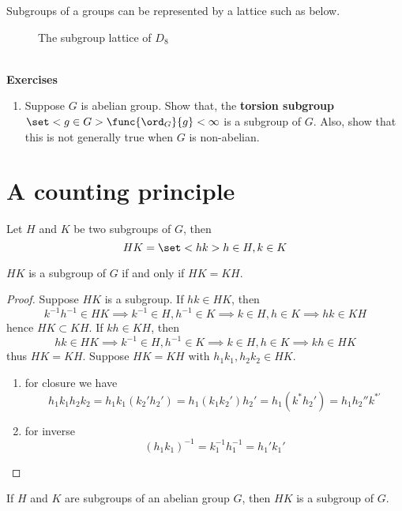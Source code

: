 Subgroups of a groups can be represented by a lattice such as below.

\begin{figure}[H]
    \centering
    
    \caption{The subgroup lattice of \(D_8\)}
\end{figure}
\ \\ 
{\Large{\textbf{Exercises}}}
\begin{enumerate}
    \item Suppose \(G\) is abelian group. Show that, the \textbf{torsion subgroup} \(\set<g \in G>{\func{\ord_G}{g} < \infty}\) is a subgroup of \(G\). Also, show that this is not generally true when \(G\) is non-abelian.
\end{enumerate}




\section{A counting principle}
Let \(H\) and \(K\) be two subgroups of \(G\), then 
\begin{equation*}
    HK = \set<hk>{h \in H, k \in K}
\end{equation*}

\begin{lemma}
    \(HK\) is a subgroup of \(G\) if and only if \(HK = KH\).
\end{lemma}
\begin{proof}
    Suppose \(HK\) is a subgroup. If \(hk \in HK\), then
    \begin{equation*}
        k^{-1}h^{-1} \in HK \implies k^{-1} \in H, h^{-1} \in K \implies k \in H,h \in K \implies hk  \in KH 
    \end{equation*}
    hence \(HK \subset KH\). If \(kh \in KH\), then 
    \begin{equation*}
        hk \in HK  \implies k^{-1} \in H, h^{-1} \in K \implies k \in H,h \in K \implies kh \in HK 
    \end{equation*}
    thus \(HK = KH\). Suppose \(HK = KH\) with \(h_1k_1, h_2k_2 \in HK\).
    \begin{enumerate}
        \item for closure we have 
        \begin{equation*}
            h_1k_1 h_2 k_2 = h_1 k_1(k_2' h_2') = h_1 (k_1k_2') h_2' = h_1 (k^{\ast} h_2') = h_1 h_2'' k^{\ast'}
        \end{equation*}
        \item for inverse 
        \begin{equation*}
            (h_1k_1)^{-1} = k_1^{-1} h_1^{-1} = h_1' k_1'
        \end{equation*}
    \end{enumerate}
\end{proof}
\begin{corollary}
    If \(H\) and \(K\) are subgroups of an abelian group \(G\), then \(HK\) is a subgroup of \(G\).
\end{corollary}

